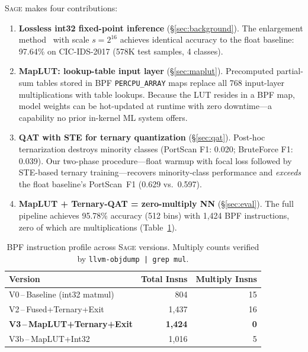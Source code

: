 \documentclass[sigconf,nonacm]{acmart}
\newcommand{\sys}{\textsc{Sage}\xspace}
\begin{document}
\sys makes four contributions:

\begin{enumerate}[leftmargin=*,itemsep=2pt]
\item \textbf{Lossless int32 fixed-point inference}
(\S\ref{sec:background}).
The enlargement method~\cite{zhang2024dsn} with scale $s = 2^{16}$
achieves identical accuracy to the float baseline: 97.64\% on
CIC-IDS-2017 (578K test samples, 4 classes).

\item \textbf{MapLUT: lookup-table input layer}
(\S\ref{sec:maplut}).
Precomputed partial-sum tables stored in BPF \texttt{PERCPU\_ARRAY}
maps replace all 768 input-layer multiplications with table lookups.
Because the LUT resides in a BPF map, model weights can be hot-updated
at runtime with zero downtime---a capability no prior in-kernel ML
system offers.

\item \textbf{QAT with STE for ternary quantization}
(\S\ref{sec:qat}).
Post-hoc ternarization destroys minority classes (PortScan F1: 0.020;
BruteForce F1: 0.039).
Our two-phase procedure---float warmup with focal loss followed by
STE-based ternary training---recovers minority-class performance
and \emph{exceeds} the float baseline's PortScan~F1
(0.629 vs.\ 0.597).

\item \textbf{MapLUT + Ternary-QAT = zero-multiply NN}
(\S\ref{sec:eval}).
The full pipeline achieves 95.78\% accuracy (512 bins) with 1{,}424 BPF
instructions, zero of which are multiplications
(Table~\ref{tab:headline}).
\end{enumerate}

\begin{table}[t]
\centering
\caption{BPF instruction profile across \sys versions.
Multiply counts verified by \texttt{llvm-objdump\,|\,grep\,mul}.}
\label{tab:headline}
\small
\begin{tabular}{lrr}
\toprule
Version & Total Insns & Multiply Insns \\
\midrule
V0\,--\,Baseline (int32 matmul)        & 804        & 15 \\
V2\,--\,Fused+Ternary+Exit             & 1{,}437    & 16 \\
\textbf{V3\,--\,MapLUT+Ternary+Exit}   & \textbf{1{,}424} & \textbf{0} \\
V3b\,--\,MapLUT+Int32                   & 1{,}016    & 5 \\
\bottomrule
\end{tabular}
\end{table}
\end{document}
